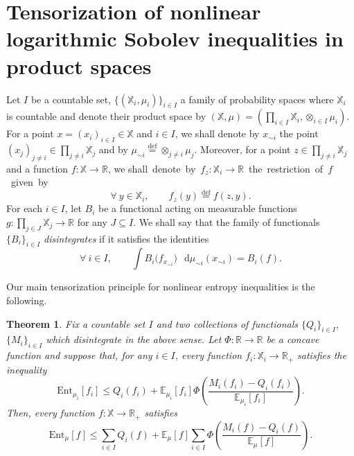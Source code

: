 \documentclass[a4paper,twoside,11pt,reqno]{amsart}
\newcommand{\eqdef}{\stackrel{\mathrm{def}}{=}}
\newtheorem{theorem}{Theorem}
\newcommand*\diff{\mathop{}\!\mathrm{d}}
\newcommand{\R}{\mathbb{R}} %
\newcommand{\mb}{\mathbb}
\newcommand{\mr}{\mathrm}
\begin{document}
\section{Tensorization of nonlinear logarithmic Sobolev inequalities in product spaces}
\label{sec:Hamming}
Let $I$ be a countable set,  $\{(\mb X_i, \mu_i)\}_{i\in I}$ a family of probability spaces where $\mb X_i$ is countable and denote their product space by $(\mb X,\mu) = (\prod_{i\in I} \mb X_i, \otimes_{i\in I}\mu_i)$.  For a point $x=(x_i)_{i\in I} \in \mb{X}$ and $i\in I$, we shall denote by $x_{\sim  i}$ the point $(x_j)_{j\neq i} \in \prod_{j\neq i} \mb{X}_j$ and by $\mu_{\sim i} \eqdef \otimes_{j\neq i} \mu_j$.  Moreover, for a point $z\in\prod_{j\neq i} \mb{X}_j$ and a function $f:\mb{X}\to\R$, we shall\mbox{ denote by $f_z:\mb{X}_i\to\R$ the restriction of $f$ given by}
\begin{equation}
\forall \ y\in\mb{X}_i,\qquad f_z(y) \eqdef f(z,y).
\end{equation} 
For each $i\in I$,  let $B_i$ be a functional acting on measurable functions $g:\mb \prod_{j\in J} \mb{X}_j\to \R$ for any $J\subseteq I$.  We shall say that the family of functionals $\{B_i\}_{i\in I}$ \emph{disintegrates} if it satisfies the identities
\begin{equation}
\forall \ i\in I, \qquad \int B_i\big(f_{x_{\sim i}}\big)\,\diff\mu_{\sim i}(x_{\sim i}) = B_i(f).
\end{equation}

Our main tensorization principle for nonlinear entropy inequalities is the following. 

\begin{theorem} \label{thm:tensor}
Fix a countable set $I$ and two collections of functionals $\{Q_i\}_{i\in I}$, $\{M_i\}_{i\in I}$ which disintegrate in the above sense.  Let $\Phi:\R\to \R$ be a concave function and suppose that, for any $i\in I$, every function $f_i:\mathbb X_i\to \R_{+}$ satisfies the inequality
\begin{equation} \label{eq:tensor-assumption}
\mr{Ent}_{\mu_i}[f_i]\le Q_i(f_i)+\mb{E}_{\mu_i}[f_i]\Phi\left(\frac{M_i(f_i)-Q_i(f_i)}{\mb{E}_{\mu_i}[f_i]}\right).
\end{equation}
Then, every function $f:\mathbb X\to \R_{+}$ satisfies
\begin{equation}
\mr{Ent}_\mu[f]\le \sum_{i\in I}Q_i(f)+\mb{E}_\mu[f]\sum_{i\in I}\Phi\left(\frac{M_i(f)-Q_i(f)}{\mb{E}_\mu[f]}\right). 
\end{equation}
\end{theorem}
\end{document}
